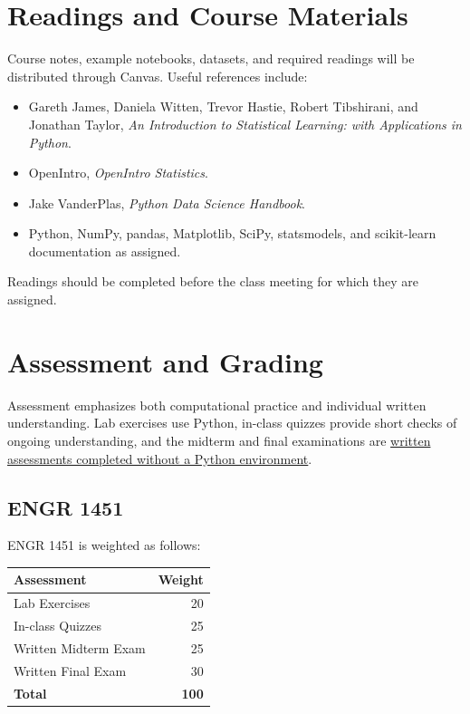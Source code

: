 \documentclass[11pt]{article}
\begin{document}
\section{Readings and Course Materials}

Course notes, example notebooks, datasets, and required readings will be distributed through Canvas. Useful references include:

\begin{itemize}
  \item Gareth James, Daniela Witten, Trevor Hastie, Robert Tibshirani, and Jonathan Taylor, \emph{An Introduction to Statistical Learning: with Applications in Python}.
  \item OpenIntro, \emph{OpenIntro Statistics}.
  \item Jake VanderPlas, \emph{Python Data Science Handbook}.
  \item Python, NumPy, pandas, Matplotlib, SciPy, statsmodels, and scikit-learn documentation as assigned.
\end{itemize}

Readings should be completed before the class meeting for which they are assigned.

\section{Assessment and Grading}

Assessment emphasizes both computational practice and individual written understanding. Lab exercises use Python, in-class quizzes provide short checks of ongoing understanding, and the midterm and final examinations are \ul{written assessments completed without a Python environment}. %

\subsection{ENGR 1451}

ENGR 1451 is weighted as follows:

\begin{center}
\begin{tabular}{@{}lr@{}}
\toprule
\textbf{Assessment} & \textbf{Weight}\\
\midrule
Lab Exercises & 20\\
In-class Quizzes & 25\\
Written Midterm Exam & 25\\
Written Final Exam & 30\\
\midrule
\textbf{Total} & \textbf{100}\\
\bottomrule
\end{tabular}
\end{center}
\end{document}
